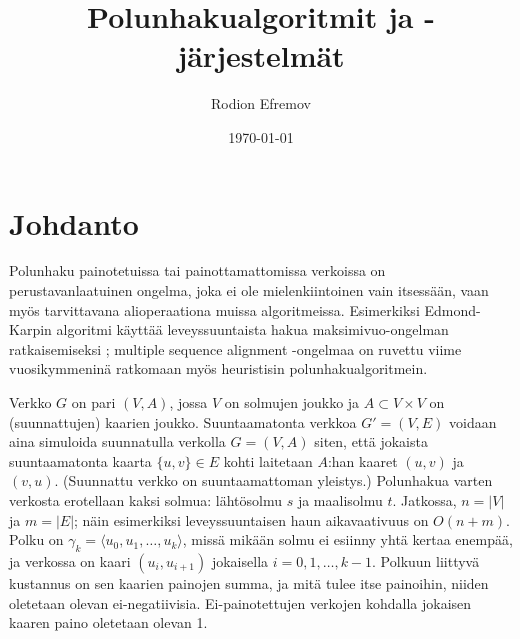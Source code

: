 \documentclass[finnish]{tktltiki2}
\title{Polunhakualgoritmit ja -järjestelmät}
\author{Rodion Efremov}
\date{\today}
\theoremstyle{definition}
\theoremstyle{remark}
\begin{document}

\frontmatter      %

\maketitle        %
\makeabstract     %

\tableofcontents  %


\mainmatter       %

\section{Johdanto}
Polunhaku painotetuissa tai painottamattomissa verkoissa on perustavanlaatuinen ongelma, joka ei ole mielenkiintoinen vain itsessään, vaan myös tarvittavana alioperaationa muissa algoritmeissa. Esimerkiksi Edmond-Karpin algoritmi käyttää leveyssuuntaista hakua maksimivuo-ongelman ratkaisemiseksi \cite{Cormen09}; multiple sequence alignment -ongelmaa on ruvettu viime vuosikymmeninä ratkomaan myös heuristisin polunhakualgoritmein.

Verkko $G$ on pari $(V, A)$, jossa $V$ on solmujen joukko ja $A \subset V \times V$ on (suunnattujen) kaarien joukko. Suuntaamatonta verkkoa $G' = (V, E)$ voidaan aina simuloida suunnatulla verkolla $G= (V, A)$ siten, että jokaista suuntaamatonta kaarta $\{ u, v \} \in E$ kohti laitetaan $A$:han kaaret $(u, v)$ ja $(v, u)$. (Suunnattu verkko on suuntaamattoman yleistys.) Polunhakua varten verkosta erotellaan kaksi solmua: lähtösolmu $s$ ja maalisolmu $t$. Jatkossa, $n = |V|$ ja $m = |E|$; näin esimerkiksi leveyssuuntaisen haun aikavaativuus on $O(n + m)$. Polku on $\gamma_k = \langle u_0, u_1, \dots, u_k \rangle$, missä mikään solmu ei esiinny yhtä kertaa enempää, ja verkossa on kaari $(u_i, u_{i + 1})$ jokaisella $i = 0, 1, \dots, k - 1$. Polkuun liittyvä kustannus on sen kaarien painojen summa, ja mitä tulee itse painoihin, niiden oletetaan olevan ei-negatiivisia. Ei-painotettujen verkojen kohdalla jokaisen kaaren paino oletetaan olevan 1.

%
%
% 
%
\end{document}
